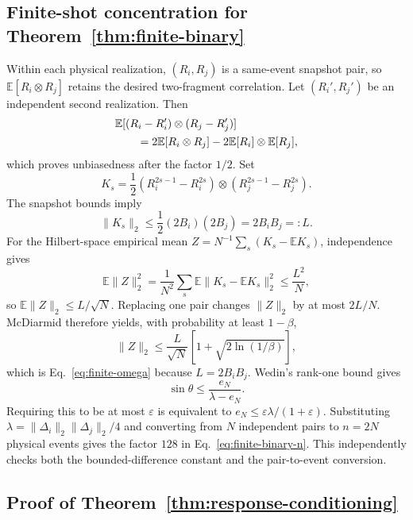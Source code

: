 \subsection{Finite-shot concentration for Theorem~\ref{thm:finite-binary}}
Within each physical realization, $(R_i,R_j)$ is a same-event snapshot pair, so $\mathbb E[R_i\otimes R_j]$ retains the desired two-fragment correlation. Let $(R_i',R_j')$ be an independent second realization. Then
\begin{align}
&\mathbb E[(R_i-R_i')\otimes(R_j-R_j')]\notag\\
&\qquad=2\mathbb E[R_i\otimes R_j]-2\mathbb E[R_i]\otimes\mathbb E[R_j],
\end{align}
which proves unbiasedness after the factor $1/2$. Set
\begin{equation}
K_s=\frac12(R_i^{2s-1}-R_i^{2s})\otimes(R_j^{2s-1}-R_j^{2s}).
\end{equation}
The snapshot bounds imply
\begin{equation}
\|K_s\|_2\le \frac12(2B_i)(2B_j)=2B_iB_j=:L.
\end{equation}
For the Hilbert-space empirical mean $Z=N^{-1}\sum_s(K_s-\mathbb EK_s)$, independence gives
\begin{equation}
\mathbb E\|Z\|_2^2
=\frac1{N^2}\sum_s\mathbb E\|K_s-\mathbb EK_s\|_2^2
\le\frac{L^2}{N},
\end{equation}
so $\mathbb E\|Z\|_2\le L/\sqrt N$. Replacing one pair changes $\|Z\|_2$ by at most $2L/N$. McDiarmid therefore yields, with probability at least $1-\beta$,
\begin{equation}
\|Z\|_2\le\frac{L}{\sqrt N}
\left[1+\sqrt{2\ln(1/\beta)}\right],
\end{equation}
which is Eq.~\eqref{eq:finite-omega} because $L=2B_iB_j$. Wedin's rank-one bound gives
\begin{equation}
\sin\theta\le\frac{e_N}{\lambda-e_N}.
\end{equation}
Requiring this to be at most $\varepsilon$ is equivalent to $e_N\le\varepsilon\lambda/(1+\varepsilon)$. Substituting $\lambda=\|\Delta_i\|_2\|\Delta_j\|_2/4$ and converting from $N$ independent pairs to $n=2N$ physical events gives the factor $128$ in Eq.~\eqref{eq:finite-binary-n}. This independently checks both the bounded-difference constant and the pair-to-event conversion.

\subsection{Proof of Theorem~\ref{thm:response-conditioning}}
